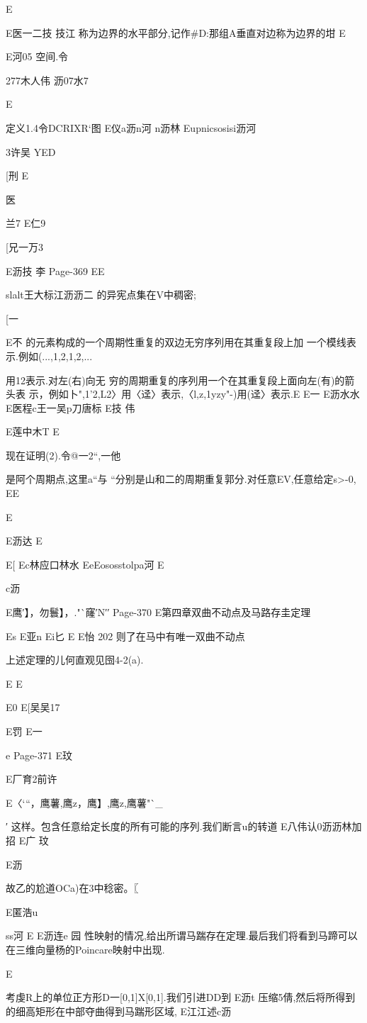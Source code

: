 {{{{{{{{{{{{{{{{{{E

E医一二技
技江
称为边界的水平部分,记作#D:那组A垂直对边称为边界的坩
E

E河05
空间.令

277木人伟
沥07水7

E

定义1.4令DCRIXR`图
E仪a沥n河
n沥林
Eupnicsosisi沥河

3许吴
YED

[刑
E

医

兰7
E仁9

[兄一万3

E沥技
李
Page-369
EE

slalt王大标江沥沥二
的异宪点集在V中稠密;

[一

E不
的元素构成的一个周期性重复的双边无穷序列用在其重复段上加
一个模线表示.例如(...,1,2,1,2,...}用{12}表示.对左(右)向无
穷的周期重复的序列用一个在其重复段上面向左(有)的箭头表
示，例如卜",1'2,L2〉用〈迳〉表示,〈l,z,1yzy"-)用(迳〉表示.E
E一
E沥水水
E医程c王一吴p刀唐标
E技
伟

E莲中木T
E

现在证明(2).令@一{2“},一他}是阿个周期点,这里a“与
“分别是山和二的周期重复郭分.对任意EV,任意给定s>-0,
EE

E

E沥达
E

E[
Ec林应口林水
EeEososstolpa河
E

c沥

E{鹰′】，勿鬟】，."`窿′N′}′
Page-370
E第四章双曲不动点及马路存圭定理

Es
E亚n
Ei匕
E
E怡
202
则了在马中有唯一双曲不动点

上述定理的儿何直观见囹4-2(a).

E
E

E0
E[吴吴17

E罚
E一

e
Page-371
E玟

E厂育2前许

E〈`“，鹰薯,鹰z，鹰】,鹰z,鹰薯"`_}′
这样。包含任意给定长度的所有可能的序列.我们断言u的转道
E八伟认0沥沥林加招
E广
玟

E沥

故乙的尬道OCa)在3中稔密。〖

E匿浩u

ss河
E
E沥连e
园
性映射的情况,给出所谓马踹存在定理.最后我们将看到马蹄可以
在三维向量杨的Poincare映射中出现.

E

考虔R上的单位正方形D一[0,1]X[0,1].我们引进DD到
E沥t
压缩5倩,然后将所得到的细高矩形在中部夺曲得到马踹形区域,
E江江述c沥

}}}}}}}}}}}}}}}
